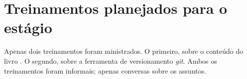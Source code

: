 
\section{Treinamentos planejados para o estágio}

Apenas dois treinamentos foram ministrados. O primeiro, sobre o
conteúdo do livro \cite{CleanCode}. O segundo, sobre a
ferramenta de versionamento \textit{git}\cite{Git}.
Ambos os treinamentos foram informais; apenas conversas sobre
os assuntos.





 
